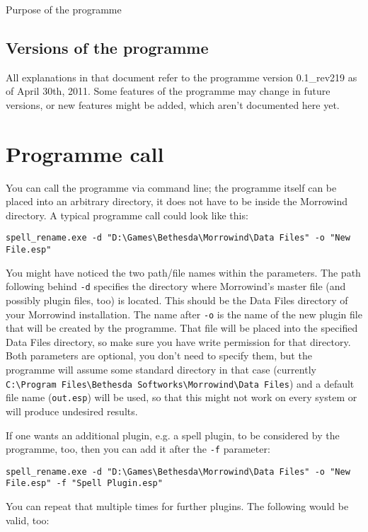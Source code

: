 \documentclass[12pt,oneside,a4paper]{article}
\begin{document}
\begin{section}{Purpose of the programme}
\subsection{Versions of the programme}
All explanations in that document refer to the programme version 0.1\_rev219 as
of April 30th, 2011. Some features of the programme may change in future
versions, or new features might be added, which aren't documented here yet.
\end{section}

\section{Programme call}
You can call the programme via command line; the programme itself can be placed
into an arbitrary directory, it does not have to be inside the Morrowind
directory. A typical programme call could look like this:

\texttt{spell\_rename.exe -d "D:\textbackslash{}Games\textbackslash{}Bethesda\textbackslash{}Morrowind\textbackslash{}Data Files" -o "New File.esp"}

You might have noticed the two path\slash file names within the parameters.
The path following behind \texttt{-d} specifies the directory where Morrowind's
master file (and possibly plugin files, too) is located. This should be the
Data Files directory of your Morrowind installation.
The name after \texttt{-o} is the name of the new plugin file that will be
created by the programme. That file will be placed into the specified Data
Files directory, so make sure you have write permission for that directory.
Both parameters are optional, you don't need to specify them, but the programme
will assume some standard directory in that case (currently \texttt{C:\textbackslash{}Program Files\textbackslash{}Bethesda Softworks\textbackslash{}Morrowind\textbackslash{}Data Files})
and a default file name (\texttt{out.esp}) will be used, so that this might not
work on every system or will produce undesired results.

If one wants an additional plugin, e.g. a spell plugin, to be considered by the
programme, too, then you can add it after the \texttt{-f} parameter:

\texttt{spell\_rename.exe -d "D:\textbackslash{}Games\textbackslash{}Bethesda\textbackslash{}Morrowind\textbackslash{}Data Files" -o "New File.esp" -f "Spell Plugin.esp"}

You can repeat that multiple times for further plugins.
The following would be valid, too:
\end{document}

